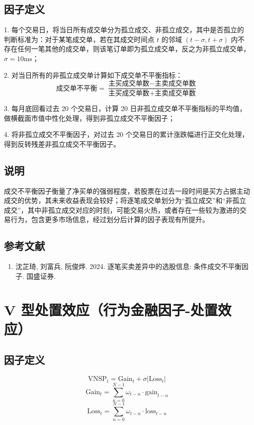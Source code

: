 \documentclass{article}
\begin{document}
\subsection{因子定义}

1. 每个交易日，将当日所有成交单分为孤立成交、非孤立成交，其中是否孤立的判断标准为：对于某笔成交单，若在其成交时间点 \( t \) 的邻域 \((t - \sigma, t + \sigma)\) 内不存在任何一笔其他的成交单，则该笔订单即为孤立成交单，反之为非孤立成交单，\(\sigma = 10\mathrm{ms}\)；

2. 对当日所有的非孤立成交单计算如下成交单不平衡指标：
\begin{equation}
    \text{成交单不平衡} = \frac{\text{主买成交单数} - \text{主卖成交单数}}{\text{主买成交单数} + \text{主卖成交单数}}
\end{equation}

3. 每月底回看过去 20 个交易日，计算 20 日非孤立成交单不平衡指标的平均值，做横截面市值中性化处理，得到非孤立成交不平衡因子；

4. 将非孤立成交不平衡因子，对过去 20 个交易日的累计涨跌幅进行正交化处理，得到反转残差非孤立成交不平衡因子。

\subsection{说明}
成交不平衡因子衡量了净买单的强弱程度，若股票在过去一段时间是买方占据主动成交的优势，其未来收益表现会较好；将逐笔成交单划分为“孤立成交”和“非孤立成交”，其中非孤立成交对应的时刻，可能交易火热，或者存在一些较为激进的交易行为，包含更多市场信息，经过划分后计算的因子表现有所提升。

\subsection{参考文献}
\begin{enumerate}
    \item 沈芷琦, 刘富兵, 阮俊烨. 2024. 逐笔买卖差异中的选股信息: 条件成交不平衡因子. 国盛证券.
\end{enumerate}

\section{V 型处置效应（行为金融因子-处置效应）}

\subsection{因子定义}
\begin{equation}
    \mathrm{VNSP}_t = \mathrm{Gain}_t + \sigma |\mathrm{Loss}_t|
\end{equation}
\begin{equation}
    \mathrm{Gain}_t = \sum_{n=0}^{N-1} \omega_{t-n} \cdot \mathrm{gain}_{t-n}
\end{equation}
\begin{equation}
    \mathrm{Loss}_t = \sum_{n=0}^{N-1} \omega_{t-n} \cdot \mathrm{loss}_{t-n}
\end{equation}
\end{document}
